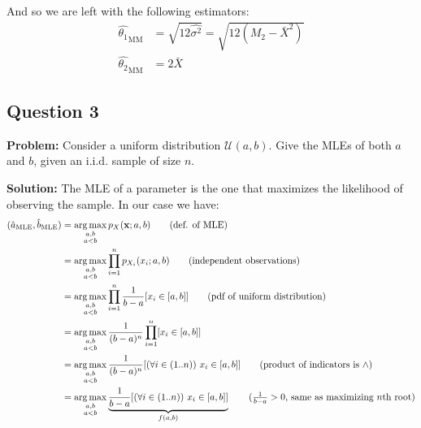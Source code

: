 \documentclass{article}
\renewcommand{\vec}[1]{\mathbf{#1}}
\DeclareMathOperator*{\argmax}{arg\,max}
\DeclareMathOperator*{\argmin}{arg\,min}
\begin{document}
And so we are left with the following estimators:
\begin{align*}
    \hat{\theta_1}_{\text{MM}}&=\sqrt{12\widehat{\sigma^2}}=\sqrt{12(M_2-\bar X^2)}\\
    \hat{\theta_2}_{\text{MM}}&=2\bar X
\end{align*}
\smallskip
\newpage

\subsection*{Question 3}
\noindent\textbf{Problem:} Consider a uniform distribution $\mathcal U(a,b)$. Give the MLEs of both $a$ and $b$, given an i.i.d. sample of size $n$.
\bigskip

\noindent\textbf{Solution:} The MLE of a parameter is the one that maximizes the likelihood of observing the sample. In our case we have:
\begin{align*}
    (\hat a_{\text{MLE}},\hat b_{\text{MLE}})&=\argmax_{\substack{a,b\\a<b}}p_X(\vec x;a,b)\tag{def. of MLE}\\
    &=\argmax_{\substack{a,b\\a<b}}\prod_{i=1}^np_{X_i}(x_i;a,b)\tag{independent observations}\\
    &=\argmax_{\substack{a,b\\a<b}}\prod_{i=1}^n\frac{1}{b-a}[x_i\in[a,b]]\tag{pdf of uniform distribution}\\
    &=\argmax_{\substack{a,b\\a<b}}\frac{1}{(b-a)^n}\prod_{i=1}^n[x_i\in[a,b]]\\
    &=\argmax_{\substack{a,b\\a<b}}\frac{1}{(b-a)^n}[(\forall i\in(1..n))\,\,x_i\in[a,b]]\tag{product of indicators is $\wedge$}\\
    &=\argmax_{\substack{a,b\\a<b}}\underbrace{\frac{1}{b-a}[(\forall i\in(1..n))\,\,x_i\in[a,b]]}_{f(a,b)}\tag{$\frac{1}{b-a}>0$, same as maximizing $n$th root}\\
\end{align*}
\end{document}
